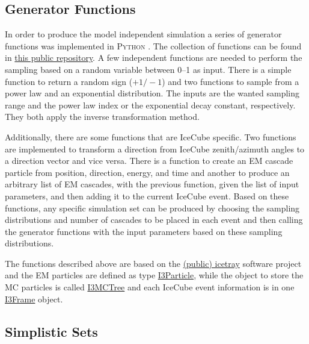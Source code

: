 \subsection{Generator Functions}

In order to produce the model independent simulation a series of generator functions was implemented in \textsc{Python} . The collection of functions can be found in \href{https://github.com/LeanderFischer/icetray_double_cascade_generator_functions}{this public repository}. A few independent functions are needed to perform the sampling based on a random variable between \SIrange[range-phrase={~and~}]{0}{1}{} as input. There is a simple function to return a random sign ($+1/-1$) and two functions to sample from a power law and an exponential distribution. The inputs are the wanted sampling range and the power law index or the exponential decay constant, respectively. They both apply the inverse transformation method.

Additionally, there are some functions that are IceCube specific. Two functions are implemented to transform a direction from IceCube zenith/azimuth angles to a direction vector and vice versa. There is a function to create an EM cascade particle from position, direction, energy, and time and another to produce an arbitrary list of EM cascades, with the previous function, given the list of input parameters, and then adding it to the current IceCube event. Based on these functions, any specific simulation set can be produced by choosing the sampling distributions and number of cascades to be placed in each event and then calling the generator functions with the input parameters based on these sampling distributions.
\begin{kaobox}[frametitle=IceCube software framework]
    The functions described above are based on the \href{https://github.com/icecube/icetray-public}{(public) icetray} software project and the EM particles are defined as type \href{https://docs.icecube.aq/icetray/main/projects/dataclasses/particle.html#i3particle}{I3Particle}, while the object to store the MC particles is called \href{https://docs.icecube.aq/icetray/main/projects/dataclasses/i3mctree.html#i3mctree}{I3MCTree} and each IceCube event information is in one \href{https://docs.icecube.aq/icetray/main/projects/icetray/classes/i3frame.html#index-0}{I3Frame} object.
\end{kaobox}


\subsection{Simplistic Sets}

